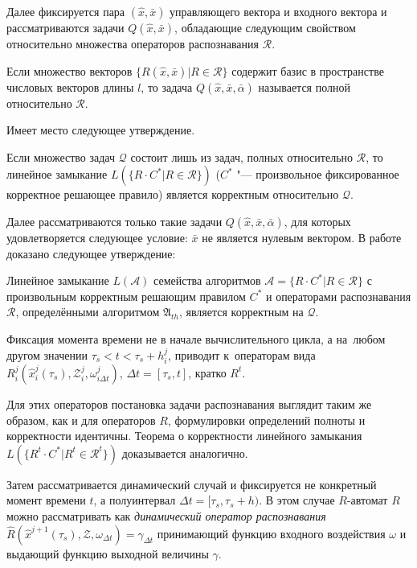 Далее фиксируется пара $(\hat{x},\bar{x})$ управляющего вектора и входного вектора и рассматриваются задачи $Q(\hat{x},\bar{x})$, обладающие следующим свойством относительно множества операторов распознавания $\mathcal{R}$.

\begin{Def}
	Если множество векторов $\{R(\hat{x},\bar{x})|R\in\mathcal R\}$ содержит базис в пространстве числовых векторов длины $l$, то задача $Q(\hat{x},\bar{x},\bar{\alpha})$ называется полной относительно $\mathcal{R}$.
\end{Def}

Имеет место следующее утверждение.
\begin{Pred}\label{st:correctness}
	Если множество задач $\mathcal Q$ состоит лишь из задач, полных относительно $\mathcal R$, то линейное замыкание $L(\{R{\cdot}C^*|R\in\mathcal R\})$ ($C^*$ "--- произвольное фиксированное корректное решающее правило) является корректным относительно $\mathcal Q$.
\end{Pred}

Далее рассматриваются только такие задачи $Q(\hat{x},\bar{x},\bar{\alpha})$, для которых удовлетворяется следующее условие: $\bar x$ не является нулевым вектором. В работе доказано следующее утверждение:
\begin{Theorem}
	\label{th:correctness}
	Линейное замыкание $L(\mathcal A)$ семейства алгоритмов $\mathcal A=\{R\cdot C^*|R\in\mathcal R\}$ с произвольным корректным решающим правилом $C^*$ и операторами распознавания $\mathcal R$, определёнными алгоритмом $\mathfrak{A}_{th}$, является корректным на $\mathcal Q$.
\end{Theorem}

Фиксация момента времени не в начале вычислительного цикла, а на~любом другом значении $\tau_s<t<\tau_s+h_i^j$, приводит к~операторам вида $R_i^j(\hat x_i^j(\tau_s), \mathcal Z_i^j, \omega_{i\Delta t}^j)$, $\Delta t=[\tau_s, t]$,  кратко $R^t$.		

Для этих операторов постановка задачи распознавания выглядит таким же образом, как и для операторов $R$, формулировки определений полноты и корректности идентичны.
Теорема о корректности линейного замыкания $L(\{R^t\cdot{C^*}|R^t\in\mathcal R^t\})$ доказывается аналогично.		

Затем рассматривается динамический случай и фиксируется не конкретный момент времени $t$, а полуинтервал ${\Delta}t=[\tau_s,\tau_s+h)$. 	В этом случае $R$-автомат $R$ можно рассматривать как \textit{динамический оператор распознавания} $\hat R(\hat x^{j+1}(\tau_s), \mathcal Z, \omega_{\Delta t})=\gamma_{\Delta t}$ принимающий  функцию входного воздействия $\omega$ и  выдающий функцию выходной величины $\gamma$. 

